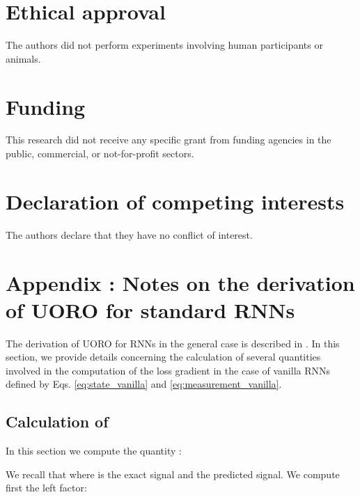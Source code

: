 \documentclass[twocolumn,a4paper]{svjour3} \sloppy          \smartqed
\begin{document}
\section*{Ethical approval}

The authors did not perform experiments involving human participants or animals.


\section*{Funding} 

This research did not receive any specific grant from funding agencies in the public, commercial, or not-for-profit sectors.


\section*{Declaration of competing interests}

The authors declare that they have no conflict of interest.



      


\appendix


\section{Appendix : Notes on the derivation of UORO for standard RNNs}\label{appendix:UORO_alg}


The derivation of UORO for RNNs in the general case is described in \citep{tallec2017unbiased}. In this section, we provide details concerning the calculation of several quantities involved in the computation of the loss gradient  in the case of vanilla RNNs defined by Eqs. \ref{eq:state_vanilla} and \ref{eq:measurement_vanilla}.

\subsection{Calculation of }
\label{Calculation of nabla_x L_n+1}

In this section we compute the quantity \footnotemark:



We recall that  where  is the exact signal and  the predicted signal. We compute first the left factor:
\end{document}
